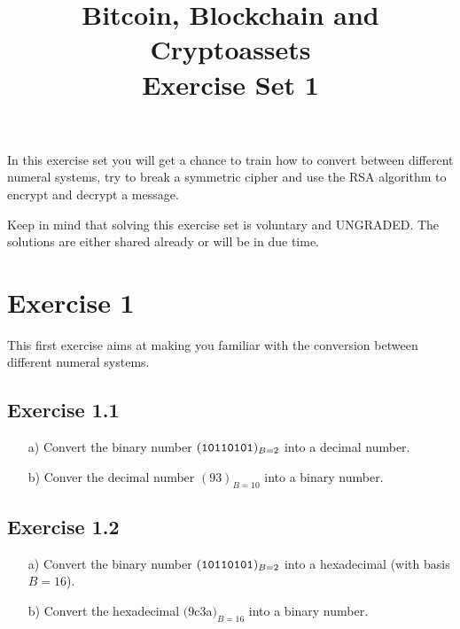 \documentclass[12pt]{article}
\title{Bitcoin, Blockchain and Cryptoassets \\ Exercise Set 1}
\author{}
\date{ }
\begin{document}
	\maketitle
	
	In this exercise set you will get a chance to train how to convert between different numeral systems, try to break a symmetric cipher and use the RSA algorithm to encrypt and decrypt a message.
	\par
	
	Keep in mind that solving this exercise set is voluntary and UNGRADED. The solutions are either shared already or will be in due time.
	

	\newpage
	
	\section*{Exercise 1}
	\label{sec:numeralSystems}
	This first exercise aims at making you familiar with the conversion between different numeral systems.
	\subsection*{Exercise 1.1}
	
	\begin{itemize}
		\item[a)] Convert the binary number $({\tt10110101})_{B=2}$ into a decimal number.
		\item[b)] Conver the decimal number $(93)_{B = 10}$ into a binary number.
	\end{itemize}

	\subsection*{Exercise 1.2}
	
	\begin{itemize}
		\item[a)] Convert the binary number $({\tt10110101})_{B=2}$ into a hexadecimal (with basis $B = 16$). 
		\item[b)] Convert the hexadecimal $($9c3a$)_{B = 16}$ into a binary number. 
	\end{itemize}
\end{document}
